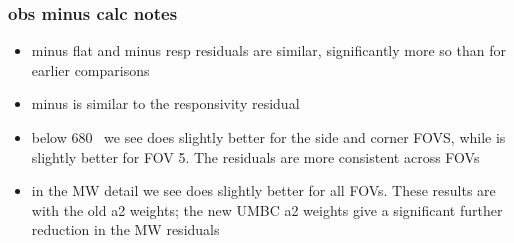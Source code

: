 \documentclass[11pt]{beamer}
\begin{document}
\begin{frame}
\frametitle{obs minus calc notes}

\begin{itemize}

  \item {\ccast} minus flat and {\noaa} minus resp residuals are
    similar, significantly more so than for earlier comparisons

  \item {\ccast} minus {\noaa} is similar to the responsivity
    residual


  \item below 680 \wn\ we see {\ccast} does slightly better for the
    side and corner FOVS, while {\noaa} is slightly better for FOV 5.  
    The {\ccast} residuals are more consistent across FOVs

  \item in the MW detail we see {\ccast} does slightly better for
    all FOVs.  These results are with the old a2 weights; the new
    UMBC a2 weights give a significant further reduction in the MW
    residuals

\end{itemize}

\end{frame}
\end{document}

